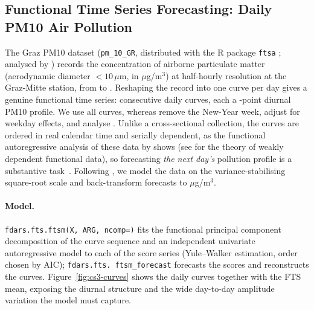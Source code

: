 

\subsection{Functional Time Series Forecasting: Daily PM10 Air Pollution}
\label{subsec:cs3-fts}

The Graz PM10 dataset (\texttt{pm\_10\_GR}, distributed with the R package
\texttt{ftsa} \citep{r_ftsa}; analysed by \citet{aue_norinho_hormann_2015})
records the
concentration of airborne particulate matter (aerodynamic diameter
$<10\,\mu$m, in $\mu$g/m$^3$) at half-hourly resolution at the Graz-Mitte
station, from \csThreeFirstDate{} to \csThreeLastDate.  Reshaping the record into
one curve per day gives a genuine functional time series: \csThreeNDays{}
consecutive daily curves, each a \csThreeNPoints-point diurnal PM10 profile.  We
use all \csThreeNDays{} curves, whereas \citet{aue_norinho_hormann_2015} remove
the New-Year week, adjust for weekday effects, and analyse \csThreeNAnh.  Unlike a cross-sectional collection, the
curves are ordered in real calendar time and serially dependent, as the
functional autoregressive analysis of these data by
\citet{aue_norinho_hormann_2015} shows (see \citealp{hormann_kokoszka_2010}
for the theory of weakly dependent functional data), so forecasting \emph{the next day's}
pollution profile is a substantive task~\citep{hyndman_ullah_2007,aue_norinho_hormann_2015}.
Following \citet{aue_norinho_hormann_2015}, we model the data on the
variance-stabilising square-root scale and back-transform forecasts to
$\mu$g/m$^3$.

\paragraph{Model.}
\texttt{fdars.fts.ftsm(X, ARG, ncomp=\csThreeNComp)} fits the functional principal
component decomposition of the curve sequence and an independent univariate
autoregressive model to each of the \csThreeNComp{} score series (Yule--Walker
estimation, order chosen by AIC); \texttt{fdars.\allowbreak fts.\allowbreak
ftsm\_forecast} forecasts the scores and reconstructs the curves.
Figure~\ref{fig:cs3-curves} shows the \csThreeNDays{} daily curves together with the FTS
mean, exposing the diurnal structure and the wide day-to-day amplitude
variation the model must capture.

